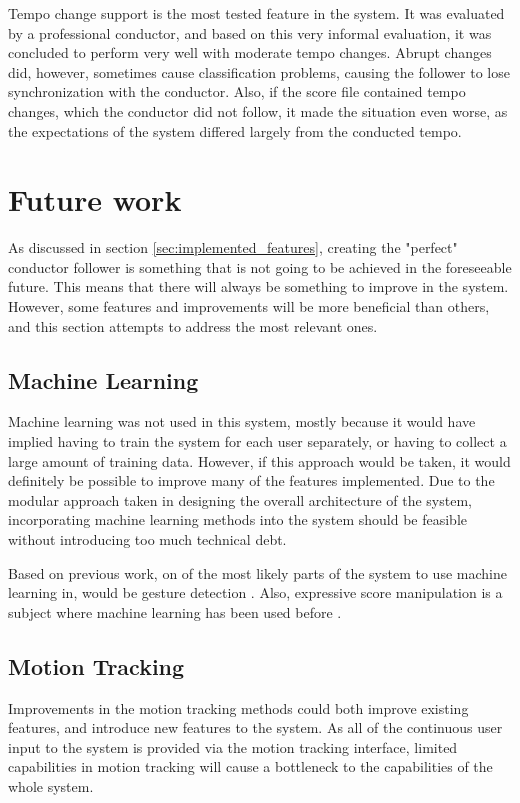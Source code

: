 Tempo change support is the most tested feature in the system.
It was evaluated by a professional conductor,
and based on this very informal evaluation,
it was concluded to perform very well with
moderate tempo changes.
Abrupt changes did, however,
sometimes cause classification problems,
causing the follower to lose synchronization with the conductor.
Also, if the score file contained tempo changes,
which the conductor did not follow,
it made the situation even worse,
as the expectations of the system differed
largely from the conducted tempo.

\section{Future work}
\label{sec:future_work}

As discussed in section \ref{sec:implemented_features},
creating the "perfect" conductor follower
is something that is not going to be achieved
in the foreseeable future.
This means that there will always be
something to improve in the system.
However, some features and improvements
will be more beneficial than others,
and this section attempts to address
the most relevant ones.

\subsection{Machine Learning}

Machine learning was not used in this system,
mostly because it would have implied having
to train the system for each user separately,
or having to collect a large amount of training data.
However, if this approach would be taken,
it would definitely be possible to improve
many of the features implemented.
Due to the modular approach taken
in designing the overall architecture of the system,
incorporating machine learning methods into the system
should be feasible without introducing too much technical debt.

Based on previous work,
on of the most likely parts of the system
to use machine learning in,
would be gesture detection \cite{Fabiani2012}.
Also, expressive score manipulation 
is a subject where machine learning
has been used before \cite{Kirke2012}.

\subsection{Motion Tracking}

Improvements in the motion tracking methods
could both improve existing features,
and introduce new features to the system.
As all of the continuous user input to the system 
is provided via the motion tracking interface,
limited capabilities in motion tracking
will cause a bottleneck to the capabilities of the whole system.

